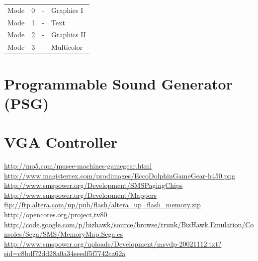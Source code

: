 \documentclass{article}
\begin{document}
\begin{table}[H]
    \centering
    \begin{tabular}{l c c l}
        Mode & 0 & - & Graphics I   \\
        Mode & 1 & - & Text         \\
        Mode & 2 & - & Graphics II  \\
        Mode & 3 & - & Multicolor   \\
    \end{tabular}
\end{table}

\section{Programmable Sound Generator (PSG)}
\section{VGA Controller}

\newpage
\begin{thebibliography}{9}
     \url{http://mo5.com/musee-machines-gamegear.html}
     \url{http://www.magisterrex.com/prodimages/EccoDolphinGameGear-h450.png}
     \url{http://www.smspower.org/Development/SMSPagingChips}
     \url{http://www.smspower.org/Development/Mappers}
     \url{ftp://ftp.altera.com/up/pub/flash/altera_up_flash_memory.zip}
     \url{http://opencores.org/project,tv80}
     \url{http://code.google.com/p/bizhawk/source/browse/trunk/BizHawk.Emulation/Consoles/Sega/SMS/MemoryMap.Sega.cs}
     \url{http://www.smspower.org/uploads/Development/msvdp-20021112.txt?sid=c8bdf72dd28a0a34eeedf5f7742ca62a}
\end{thebibliography}
\end{document}

